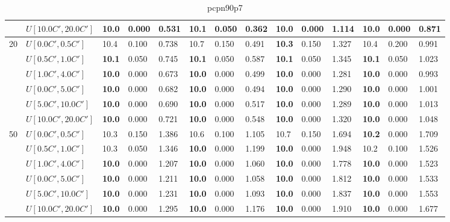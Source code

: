 \begin{table}[h]
{\begin{tabular}{|l|l||l|l|l||l|l|l||l|l|l||l|l|l|}
       & $U[10.0C',20.0C']$ & \textbf{10.0} & 0.000 & 0.531 & 10.1 & 0.050 & 0.362 & \textbf{10.0} & 0.000 & 1.114 & \textbf{10.0} & 0.000 & 0.871 \\
      \hline\hline
      \multirow{6}{*}{20} & $U[0.0C',0.5C']$ & 10.4 & 0.100 & 0.738 & 10.7 & 0.150 & 0.491 & \textbf{10.3} & 0.150 & 1.327 & 10.4 & 0.200 & 0.991 \\
       & $U[0.5C',1.0C']$ & \textbf{10.1} & 0.050 & 0.745 & \textbf{10.1} & 0.050 & 0.587 & \textbf{10.1} & 0.050 & 1.345 & \textbf{10.1} & 0.050 & 1.023 \\
       & $U[1.0C',4.0C']$ & \textbf{10.0} & 0.000 & 0.673 & \textbf{10.0} & 0.000 & 0.499 & \textbf{10.0} & 0.000 & 1.281 & \textbf{10.0} & 0.000 & 0.993 \\
       & $U[0.0C',5.0C']$ & \textbf{10.0} & 0.000 & 0.682 & \textbf{10.0} & 0.000 & 0.494 & \textbf{10.0} & 0.000 & 1.290 & \textbf{10.0} & 0.000 & 1.001 \\
       & $U[5.0C',10.0C']$ & \textbf{10.0} & 0.000 & 0.690 & \textbf{10.0} & 0.000 & 0.517 & \textbf{10.0} & 0.000 & 1.289 & \textbf{10.0} & 0.000 & 1.013 \\
       & $U[10.0C',20.0C']$ & \textbf{10.0} & 0.000 & 0.721 & \textbf{10.0} & 0.000 & 0.548 & \textbf{10.0} & 0.000 & 1.320 & \textbf{10.0} & 0.000 & 1.048 \\
      \hline\hline
      \multirow{6}{*}{50} & $U[0.0C',0.5C']$ & 10.3 & 0.150 & 1.386 & 10.6 & 0.100 & 1.105 & 10.7 & 0.150 & 1.694 & \textbf{10.2} & 0.000 & 1.709 \\
       & $U[0.5C',1.0C']$ & 10.3 & 0.050 & 1.346 & \textbf{10.0} & 0.000 & 1.199 & \textbf{10.0} & 0.000 & 1.948 & 10.2 & 0.100 & 1.526 \\
       & $U[1.0C',4.0C']$ & \textbf{10.0} & 0.000 & 1.207 & \textbf{10.0} & 0.000 & 1.060 & \textbf{10.0} & 0.000 & 1.778 & \textbf{10.0} & 0.000 & 1.523 \\
       & $U[0.0C',5.0C']$ & \textbf{10.0} & 0.000 & 1.211 & \textbf{10.0} & 0.000 & 1.058 & \textbf{10.0} & 0.000 & 1.812 & \textbf{10.0} & 0.000 & 1.533 \\
       & $U[5.0C',10.0C']$ & \textbf{10.0} & 0.000 & 1.231 & \textbf{10.0} & 0.000 & 1.093 & \textbf{10.0} & 0.000 & 1.837 & \textbf{10.0} & 0.000 & 1.553 \\
       & $U[10.0C',20.0C']$ & \textbf{10.0} & 0.000 & 1.295 & \textbf{10.0} & 0.000 & 1.176 & \textbf{10.0} & 0.000 & 1.910 & \textbf{10.0} & 0.000 & 1.677 \\
      \hline
      \end{tabular}
      }
      \caption{pcpn90p7}
      \label{tab:pcpn90p7}\end{table}
      
